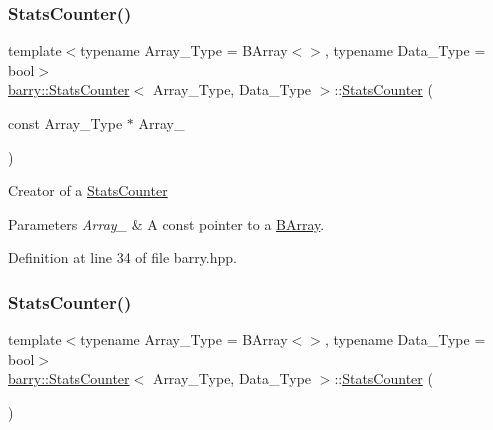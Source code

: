 \subsubsection{\texorpdfstring{Stats\+Counter()}{StatsCounter()}\hspace{0.1cm}{\footnotesize\ttfamily [1/2]}}
{\footnotesize\ttfamily template$<$typename Array\+\_\+\+Type = B\+Array$<$$>$, typename Data\+\_\+\+Type = bool$>$ \\
\hyperlink{classbarry_1_1_stats_counter}{barry\+::\+Stats\+Counter}$<$ Array\+\_\+\+Type, Data\+\_\+\+Type $>$\+::\hyperlink{classbarry_1_1_stats_counter}{Stats\+Counter} (\begin{DoxyParamCaption}\item[{const Array\+\_\+\+Type $\ast$}]{Array\+\_\+ }\end{DoxyParamCaption})\hspace{0.3cm}{\ttfamily [inline]}}



Creator of a {\ttfamily \hyperlink{classbarry_1_1_stats_counter}{Stats\+Counter}} 


\begin{DoxyParams}{Parameters}
{\em Array\+\_\+} & A const pointer to a {\ttfamily \hyperlink{classbarry_1_1_b_array}{B\+Array}}. \\
\hline
\end{DoxyParams}


Definition at line 34 of file barry.\+hpp.

\mbox{\label{classbarry_1_1_stats_counter_a407df1580b207faac92c476c7062b840}} 
\subsubsection{\texorpdfstring{Stats\+Counter()}{StatsCounter()}\hspace{0.1cm}{\footnotesize\ttfamily [2/2]}}
{\footnotesize\ttfamily template$<$typename Array\+\_\+\+Type = B\+Array$<$$>$, typename Data\+\_\+\+Type = bool$>$ \\
\hyperlink{classbarry_1_1_stats_counter}{barry\+::\+Stats\+Counter}$<$ Array\+\_\+\+Type, Data\+\_\+\+Type $>$\+::\hyperlink{classbarry_1_1_stats_counter}{Stats\+Counter} (\begin{DoxyParamCaption}{ }\end{DoxyParamCaption})\hspace{0.3cm}{\ttfamily [inline]}}



